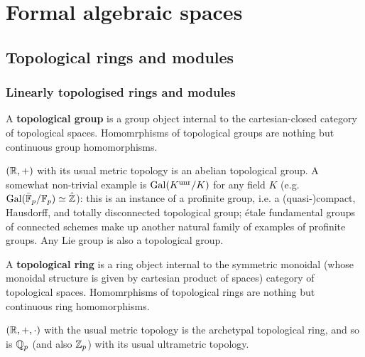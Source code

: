 \section{Formal algebraic spaces}
    \subsection{Topological rings and modules}
        \subsubsection{Linearly topologised rings and modules}
            \begin{definition} \label{def: topological_groups}
                A \textbf{topological group} is a group object internal to the cartesian-closed category of topological spaces. Homomrphisms of topological groups are nothing but continuous group homomorphisms.
            \end{definition}
            \begin{example}
                $(\mathbb{R}, +)$ with its usual metric topology is an abelian topological group. A somewhat non-trivial example is $\mathrm{Gal}(K^{\mathrm{unr}}/K)$ for any field $K$ (e.g. $\mathrm{Gal}(\bar{\mathbb{F}}_p/\mathbb{F}_p) \simeq \hat{\mathbb{Z}}$): this is an instance of a profinite group, i.e. a (quasi-)compact, Hausdorff, and totally disconnected topological group; \'etale fundamental groups of connected schemes make up another natural family of examples of profinite groups. Any Lie group is also a topological group.
            \end{example}
            \begin{definition} \label{def: topological_rings}
                A \textbf{topological ring} is a ring object internal to the symmetric monoidal (whose monoidal structure is given by cartesian product of spaces) category of topological spaces. Homomrphisms of topological rings are nothing but continuous ring homomorphisms.
            \end{definition}
            \begin{example}
                $(\mathbb{R}, +, \cdot)$ with the usual metric topology is the archetypal topological ring, and so is $\mathbb{Q}_p$ (and also $\mathbb{Z}_p$) with its usual ultrametric topology.
            \end{example}
